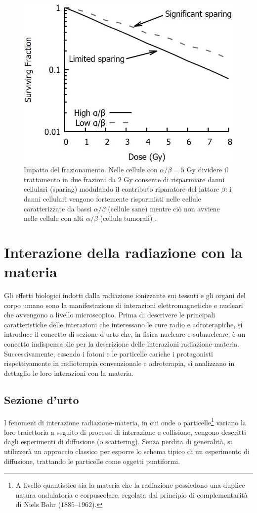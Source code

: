 \documentclass[12pt,a4paper,twoside]{report}
\begin{document}
	\begin{figure}[H]
		\centering
		\includegraphics[width=0.9\linewidth]{sparing.jpg}
		\caption{Impatto del frazionamento. Nelle cellule con $\alpha/\beta=5\mbox{ Gy}$ dividere il trattamento in due frazioni da $2\mbox{ Gy}$ consente di risparmiare danni cellulari (sparing) modulando il contributo riparatore del fattore $\beta$: i danni cellulari vengono fortemente risparmiati nelle cellule caratterizzate da bassi $\alpha/\beta$ (cellule sane) mentre ciò non avviene nelle cellule con alti $\alpha/\beta$ (cellule tumorali) \cite{McMahon_2019}.}
		\label{fig:sparing}
	\end{figure}
	
	\section{Interazione della radiazione con la materia}
	Gli effetti biologici indotti dalla radiazione ionizzante sui tessuti e gli organi del corpo umano sono la manifestazione di interazioni elettromagnetiche e nucleari che avvengono a livello microscopico. Prima di descrivere le principali caratteristiche delle interazioni che interessano le cure radio e adroterapiche, si introduce il concetto di sezione d'urto che, in fisica nucleare e subnucleare, è un concetto indispensabile per la descrizione delle interazioni radiazione-materia. Successivamente, essendo i fotoni e le particelle cariche i protagonisti rispettivamente in radioterapia convenzionale e adroterapia, si analizzano in dettaglio le loro interazioni con la materia.
	
	\subsection{Sezione d'urto}\label{sec:sezione_urto}
	I fenomeni di interazione radiazione-materia, in cui onde o particelle\footnote{A livello quantistico sia la materia che la radiazione possiedono una duplice natura ondulatoria e corpuscolare, regolata dal principio di complementarità di Niels Bohr ($1885$--$1962$).} variano la loro traiettoria a seguito di processi di interazione e collisione, vengono descritti dagli esperimenti di diffusione (o scattering). Senza perdita di generalità, si utilizzerà un approccio classico per esporre lo schema tipico di un esperimento di diffusione, trattando le particelle come oggetti puntiformi.
	
\end{document}
